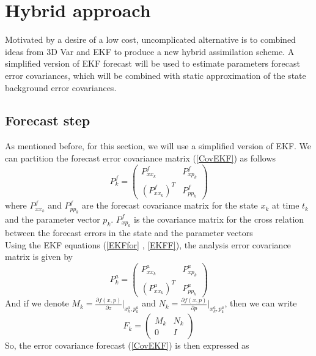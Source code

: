 \documentclass[a4,12pt]{article}
\numberwithin{equation}{section}
\begin{document}
\section{Hybrid approach}
Motivated by a desire of a low cost, uncomplicated alternative is to combined ideas from 3D Var and EKF to produce a new hybrid assimilation scheme. A simplified version of EKF forecast will be used to estimate parameters forecast error covariances, which will be combined with static approximation of the state background error covariances.

\subsection{Forecast step}
As mentioned before, for this section, we will use a simplified version of EKF. We can partition the forecast error covariance matrix  (\ref{CovEKF}) as follows
\begin{equation}
    P_k^f = 
\begin{pmatrix}
P_{xx_k}^f  & P_{xp_k}^f \\
(P_{xx_k}^f)^T &  P_{pp_k}^f 
\end{pmatrix}  
\end{equation}
where $P_{xx_k}^f $  and $P_{pp_k}^f $ are the forecast covariance matrix for the state $x_k$ at time $t_k$ and the parameter vector $p_k$. $P_{xp_k}^f $ is the covariance matrix for the cross relation between the forecast errors in the state and the parameter vectors \\
Using the EKF equations (\ref{EKFfor} , \ref{EKFF}), the analysis error covariance matrix is given by
\begin{equation}
    P_k^a = 
\begin{pmatrix}
P_{xx_k}^a & P_{xp_k}^a \\
(P_{xx_k}^a)^T &  P_{pp_k}^a
\end{pmatrix}  
\end{equation}
And if we denote $M_k = \frac{\partial f(x,p) }{ \partial z} \big|_{x_k^a, p_k^a} $ and $N_k = \frac{\partial f(x,p)}{  \partial p } \big|_{x_k^a, p_k^a}$, then we can write 
\begin{equation}
    F_k = 
\begin{pmatrix}
M_k & N_k \\
 0  & I
\end{pmatrix}  
\end{equation}
So, the error covariance forecast (\ref{CovEKF})  is then expressed as
\end{document}
